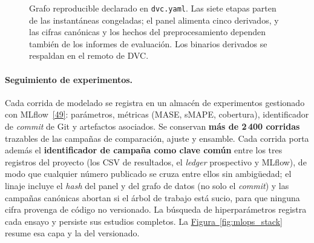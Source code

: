 \documentclass[12pt,letterpaper]{report}
\newcommand{\cita}[1]{\hyperref[bib:#1]{[#1]}}
\begin{document}
\begin{figure}[htbp]
\caption[Grafo reproducible de datos]{Grafo reproducible declarado en \texttt{dvc.yaml}. Las
siete etapas parten de las instantáneas congeladas; el panel alimenta cinco derivados, y las
cifras canónicas y los hechos del preprocesamiento dependen también de los informes de
evaluación. Los binarios derivados se respaldan en el remoto de DVC.}
\label{fig:mlops_dag}
\end{figure}

\paragraph{Seguimiento de experimentos.} Cada corrida de modelado se registra en un almac\'en de
experimentos gestionado con MLflow~\cita{49}: par\'ametros, m\'etricas (MASE, sMAPE, cobertura),
identificador de \textit{commit} de Git y artefactos asociados. Se conservan \textbf{m\'as de
2\,400 corridas} trazables de las campa\~nas de comparaci\'on, ajuste y ensamble. Cada corrida
porta además el \textbf{identificador de campa\~na como clave com\'un} entre los tres registros
del proyecto (los CSV de resultados, el \textit{ledger} prospectivo y MLflow), de modo que
cualquier n\'umero publicado se cruza entre ellos sin ambig\"uedad; el linaje incluye el
\textit{hash} del panel y del grafo de datos (no solo el \textit{commit}) y las campa\~nas
can\'onicas abortan si el \'arbol de trabajo est\'a sucio, para que ninguna cifra provenga de
c\'odigo no versionado. La b\'usqueda de hiperpar\'ametros registra cada ensayo y persiste sus
estudios completos. La
\hyperref[fig:mlops_stack]{Figura~\ref*{fig:mlops_stack}} resume esa capa y la del versionado.
\end{document}
